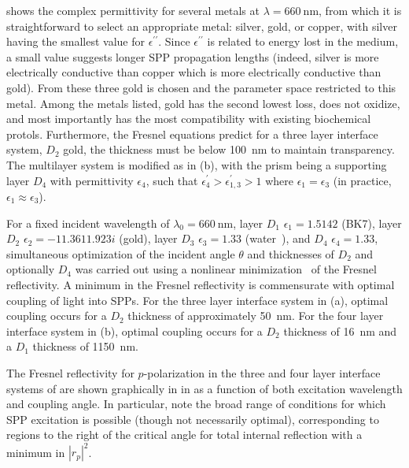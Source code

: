  shows the complex permittivity for several metals
at $\lambda=\SI{660}{\nano\meter}$, from which it is straightforward to
select an appropriate metal: silver, gold, or copper, with silver having
the smallest value for $\epsilon^{\prime\prime}$.  Since
$\epsilon^{\prime\prime}$ is related to energy lost in the medium, a small
value suggests longer SPP propagation lengths (indeed, silver is more
electrically conductive than copper which is more electrically conductive
than gold).  From these three gold is chosen and the parameter space
restricted to this metal.  Among the metals listed, gold has the second
lowest loss, does not oxidize, and most importantly has the most
compatibility with existing biochemical protols.  Furthermore, the Fresnel
equations predict for a three layer interface system, $D_2$ gold, the
thickness must be below \SI{100}{\nano\meter} to maintain transparency.
The multilayer system is modified as in (b),
with the prism being a supporting layer $D_4$ with permittivity
$\epsilon_4$, such that $\epsilon^\prime_4>\epsilon^\prime_{1,3}>1$ where
$\epsilon_1=\epsilon_3$ (in practice, $\epsilon_1\approx\epsilon_3$).

For a fixed incident wavelength of $\lambda_0=\SI{660}{\nano\meter}$, layer
$D_1$ $\epsilon_1=1.5142$ (BK7), layer $D_2$
$\epsilon_2=\num{-11.361+1.923i}$ (gold), layer $D_3$ $\epsilon_3=1.33$
(water~\cite{andreasson1971measurement}), and $D_4$ $\epsilon_4=1.33$,
simultaneous optimization of the incident angle $\theta$ and thicknesses of
$D_2$ and optionally $D_4$ was carried out using a nonlinear
minimization~\cite{brent1973algorithms} of the Fresnel reflectivity.  A
minimum in the Fresnel reflectivity is commensurate with optimal coupling
of light into SPPs.  For the three layer interface system in
(a), optimal coupling occurs for a $D_2$
thickness of approximately \SI{50}{\nano\meter}.  For the four layer
interface system in (b), optimal coupling
occurs for a $D_2$ thickness of \SI{16}{\nano\meter} and a $D_1$ thickness
of \SI{1150}{\nano\meter}.

The Fresnel reflectivity for $p$-polarization in the three and four layer
interface systems of  are shown graphically
in in  as a function of both excitation wavelength
and coupling angle.  In particular, note the broad range of conditions for
which SPP excitation is possible (though not necessarily optimal),
corresponding to regions to the right of the critical angle for total
internal reflection with a minimum in $|r_p|^2$.

